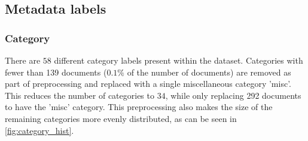 \subsection{Metadata labels}\label{sec:appendix_meta_data}


\subsubsection{Category}\label{subsec:appendix_category}

There are $58$ different category labels present within the dataset.
Categories with fewer than 139 documents ($0.1\%$ of the number of documents) are removed as part of preprocessing and replaced with a single miscellaneous category 'misc'.
This reduces the number of categories to $34$, while only replacing 292 documents to have the 'misc' category.
This preprocessing also makes the size of the remaining categories more evenly distributed, as can be seen in \autoref{fig:category_hist}.

